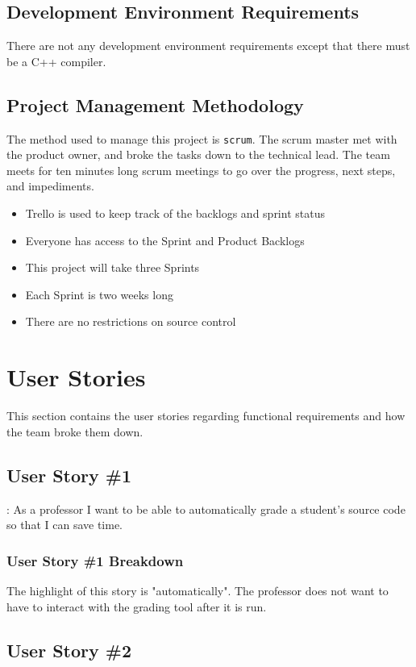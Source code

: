 \subsection{Development Environment Requirements}
There are not any development environment requirements except that there must be a C++ compiler.


\subsection{Project  Management Methodology}
The method used to manage this project is {\tt scrum}. The scrum master met with the product owner, and broke the tasks down to the technical lead. The team meets for ten minutes long scrum meetings to go over the progress, next steps, and impediments. 
 
\begin{itemize}
\item Trello is used to keep track of the backlogs and sprint status
\item Everyone has access to the Sprint and Product Backlogs
\item This project will take three Sprints
\item Each Sprint is two weeks long
\item There are no restrictions on source control 
\end{itemize}

\section{User Stories}
This section contains the user stories regarding functional requirements and how the team broke them down.


\subsection{User Story \#1}:
As a professor I want to be able to automatically grade a student's source code so that I can save time.

\subsubsection{User Story \#1 Breakdown} 
The highlight of this story is "automatically". The professor does not want to have to interact with the grading tool after it is run.
\subsection{User Story \#2} 

